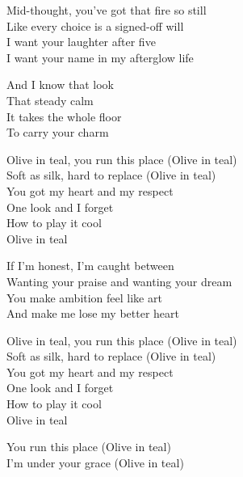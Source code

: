 \begin{lyrics}
Mid-thought, you’ve got that fire so still\\
Like every choice is a signed-off will\\
I want your laughter after five\\
I want your name in my afterglow life

And I know that look\\
That steady calm\\
It takes the whole floor\\
To carry your charm

Olive in teal, you run this place
(Olive in teal)\\
Soft as silk, hard to replace
(Olive in teal)\\
You got my heart and my respect\\
One look and I forget\\
How to play it cool\\
Olive in teal

If I’m honest, I’m caught between\\
Wanting your praise and wanting your dream\\
You make ambition feel like art\\
And make me lose my better heart

Olive in teal, you run this place
(Olive in teal)\\
Soft as silk, hard to replace
(Olive in teal)\\
You got my heart and my respect\\
One look and I forget\\
How to play it cool\\
Olive in teal

You run this place
(Olive in teal)\\
I’m under your grace
(Olive in teal)
\end{lyrics}

